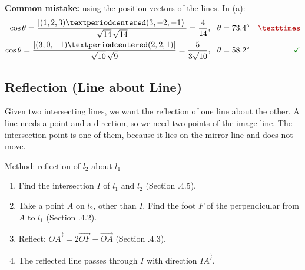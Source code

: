 \begin{mistake}
\textbf{Common mistake:} using the position vectors of the lines. In (a):
\begin{align*}
\cos\theta = \dfrac{|(1,2,3)\cdot(3,-2,-1)|}{\sqrt{14}\,\sqrt{14}} = \dfrac{4}{14}, \ \ \theta = 73.4^{\circ} & & \wrong \\
\cos\theta = \dfrac{|(3,0,-1)\cdot(2,2,1)|}{\sqrt{10}\,\sqrt{9}} = \dfrac{5}{3\sqrt{10}}, \ \ \theta = 58.2^{\circ} & & \cmark
\end{align*}
\end{mistake}

\clearpage
\subsection{Reflection (Line about Line)}
Given two intersecting lines, we want the reflection of one line about the other. A line needs a point and a direction, so we need two points of the image line. The intersection point is one of them, because it lies on the mirror line and does not move.

\begin{definition}{Method: reflection of $l_2$ about $l_1$}
\begin{enumerate}
  \item Find the intersection $I$ of $l_1$ and $l_2$ (Section \chapnum.4.5).
  \item Take a point $A$ on $l_2$, other than $I$. Find the foot $F$ of the perpendicular from $A$ to $l_1$ (Section \chapnum.4.2).
  \item Reflect: $\overrightarrow{OA'} = 2\overrightarrow{OF} - \overrightarrow{OA}$ (Section \chapnum.4.3).
  \item The reflected line passes through $I$ with direction $\overrightarrow{IA'}$.
\end{enumerate}
\end{definition}

\begin{center}
\end{center}

